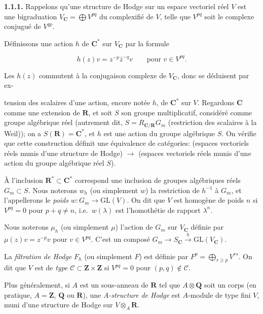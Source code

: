 \documentclass[10pt,a4paper]{article}
\newcommand{\SourcePage}[2]{\clearpage\setcounter{page}{#2}\typeout{D031_SOURCE_PAGE physical=#1 printed=#2}}
\begin{document}
\textbf{1.1.1.} Rappelons qu'une structure de Hodge sur un espace vectoriel réel \(V\) est une bigraduation \(V_{\mathbf C}=\bigoplus V^{pq}\) du complexifié de \(V\), telle que \(V^{pq}\) soit le complexe conjugué de \(V^{qp}\).

Définissons une action \(h\) de \(\mathbf C^*\) sur \(V_{\mathbf C}\) par la formule

\[
\tag{1.1.1.1}
h(z)v=z^{-p}\bar z^{-q}v\qquad\text{pour }v\in V^{pq}.
\]

Les \(h(z)\) commutent à la conjugaison complexe de \(V_{\mathbf C}\), donc se déduisent par ex-

\SourcePage{6}{252}
tension des scalaires d'une action, encore notée \(h\), de \(\mathbf C^*\) sur \(V\). Regardons \(\mathbf C\) comme une extension de \(\mathbf R\), et soit \(S\) son groupe multiplicatif, considéré comme groupe algébrique réel (autrement dit, \(S=R_{\mathbf C/\mathbf R}G_m\) (restriction des scalaires à la Weil)); on a \(S(\mathbf R)=\mathbf C^*\), et \(h\) est une action du groupe algébrique \(S\). On vérifie que cette construction définit une équivalence de catégories: (espaces vectoriels réels munis d'une structure de Hodge) \(\to\) (espaces vectoriels réels munis d'une action du groupe algébrique réel \(S\)).

À l'inclusion \(\mathbf R^*\subset\mathbf C^*\) correspond une inclusion de groupes algébriques réels \(G_m\subset S\). Nous noterons \(w_h\) (ou simplement \(w\)) la restriction de \(h^{-1}\) à \(G_m\), et l'appellerons le \emph{poids} \(w:G_m\to\mathrm{GL}(V)\). On dit que \(V\) est homogène de poids \(n\) si \(V^{pq}=0\) pour \(p+q\ne n\), i.e.~\(w(\lambda)\) est l'homothétie de rapport \(\lambda^n\).

Nous noterons \(\mu_h\) (ou simplement \(\mu\)) l'action de \(G_m\) sur \(V_{\mathbf C}\) définie par \(\mu(z)v=z^{-p}v\) pour \(v\in V^{pq}\). C'est un composé \(G_m\to S_{\mathbf C}\xrightarrow{h}\mathrm{GL}(V_{\mathbf C})\).

La \emph{filtration de Hodge} \(F_h\) (ou simplement \(F\)) est définie par \(F^p=\bigoplus_{r\ge p}V^{rs}\). On dit que \(V\) est de \emph{type} \(\mathscr C\subset\mathbf Z\times\mathbf Z\) si \(V^{pq}=0\) pour \((p,q)\notin\mathscr C\).

Plus généralement, si \(A\) est un sous-anneau de \(\mathbf R\) tel que \(A\otimes\mathbf Q\) soit un corps (en pratique, \(A=\mathbf Z\), \(\mathbf Q\) ou \(\mathbf R\)), une \emph{\(A\)-structure de Hodge} est \(A\)-module de type fini \(V\), muni d'une structure de Hodge sur \(V\otimes_A\mathbf R\).
\end{document}
